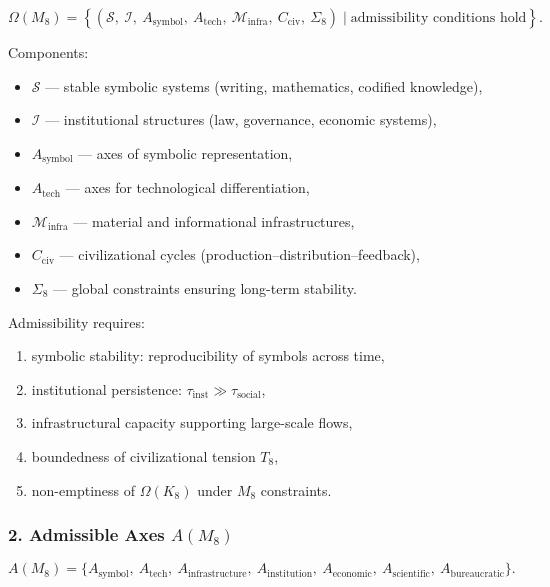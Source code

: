 \[
\Omega(M_8)=
\left\{
(
\mathcal{S},\
\mathcal{I},\
A_{\mathrm{symbol}},\
A_{\mathrm{tech}},\
\mathcal{M}_{\mathrm{infra}},\
C_{\mathrm{civ}},\
\Sigma_8
)
\mid \text{admissibility conditions hold}
\right\}.
\]

Components:

\begin{itemize}
    \item $\mathcal{S}$ — stable symbolic systems (writing, mathematics, codified knowledge),
    \item $\mathcal{I}$ — institutional structures (law, governance, economic systems),
    \item $A_{\mathrm{symbol}}$ — axes of symbolic representation,
    \item $A_{\mathrm{tech}}$ — axes for technological differentiation,
    \item $\mathcal{M}_{\mathrm{infra}}$ — material and informational infrastructures,
    \item $C_{\mathrm{civ}}$ — civilizational cycles (production–distribution–feedback),
    \item $\Sigma_8$ — global constraints ensuring long-term stability.
\end{itemize}

Admissibility requires:

\begin{enumerate}
    \item symbolic stability: reproducibility of symbols across time,
    \item institutional persistence: $\tau_{\mathrm{inst}} \gg \tau_{\mathrm{social}}$,
    \item infrastructural capacity supporting large-scale flows,
    \item boundedness of civilizational tension $T_8$,
    \item non-emptiness of $\Omega(K_8)$ under $M_8$ constraints.
\end{enumerate}

\subsubsection*{2. Admissible Axes \texorpdfstring{$A(M_8)$}{A(M_8)}}

\[
A(M_8)=
\{
A_{\mathrm{symbol}},\
A_{\mathrm{tech}},\
A_{\mathrm{infrastructure}},\
A_{\mathrm{institution}},\
A_{\mathrm{economic}},\
A_{\mathrm{scientific}},\
A_{\mathrm{bureaucratic}}
\}.
\]

